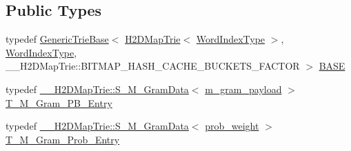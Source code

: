 \subsection*{Public Types}
\begin{DoxyCompactItemize}
\item 
typedef \hyperlink{classuva_1_1smt_1_1bpbd_1_1server_1_1lm_1_1_generic_trie_base}{Generic\+Trie\+Base}$<$ \hyperlink{classuva_1_1smt_1_1bpbd_1_1server_1_1lm_1_1_h2_d_map_trie}{H2\+D\+Map\+Trie}$<$ \hyperlink{classuva_1_1smt_1_1bpbd_1_1server_1_1lm_1_1_word_index_trie_base_a77ee32bf3a9f8a89558bda4f2031200c}{Word\+Index\+Type} $>$, \hyperlink{classuva_1_1smt_1_1bpbd_1_1server_1_1lm_1_1_word_index_trie_base_a77ee32bf3a9f8a89558bda4f2031200c}{Word\+Index\+Type}, \+\_\+\+\_\+\+H2\+D\+Map\+Trie\+::\+B\+I\+T\+M\+A\+P\+\_\+\+H\+A\+S\+H\+\_\+\+C\+A\+C\+H\+E\+\_\+\+B\+U\+C\+K\+E\+T\+S\+\_\+\+F\+A\+C\+T\+O\+R $>$ \hyperlink{classuva_1_1smt_1_1bpbd_1_1server_1_1lm_1_1_h2_d_map_trie_a2830d3f27bbedbdecaa0b50f95dc4920}{B\+A\+S\+E}
\item 
typedef \hyperlink{structuva_1_1smt_1_1bpbd_1_1server_1_1lm_1_1_____h2_d_map_trie_1_1_s___m___gram_data}{\+\_\+\+\_\+\+H2\+D\+Map\+Trie\+::\+S\+\_\+\+M\+\_\+\+Gram\+Data}$<$ \hyperlink{namespaceuva_1_1smt_1_1bpbd_1_1server_1_1lm_1_1m__grams_a1422aa6b3f3cb9377916d20e9bf16c0a}{m\+\_\+gram\+\_\+payload} $>$ \hyperlink{classuva_1_1smt_1_1bpbd_1_1server_1_1lm_1_1_h2_d_map_trie_a8cd5c71c1bc130cd32e03b28c0f50cb3}{T\+\_\+\+M\+\_\+\+Gram\+\_\+\+P\+B\+\_\+\+Entry}
\item 
typedef \hyperlink{structuva_1_1smt_1_1bpbd_1_1server_1_1lm_1_1_____h2_d_map_trie_1_1_s___m___gram_data}{\+\_\+\+\_\+\+H2\+D\+Map\+Trie\+::\+S\+\_\+\+M\+\_\+\+Gram\+Data}$<$ \hyperlink{namespaceuva_1_1smt_1_1bpbd_1_1server_a01e9ea4de9c226f4464862e84ff0bbcc}{prob\+\_\+weight} $>$ \hyperlink{classuva_1_1smt_1_1bpbd_1_1server_1_1lm_1_1_h2_d_map_trie_ad05095f6dc0b97d56cb9ff2c3217ae1a}{T\+\_\+\+M\+\_\+\+Gram\+\_\+\+Prob\+\_\+\+Entry}
\end{DoxyCompactItemize}
